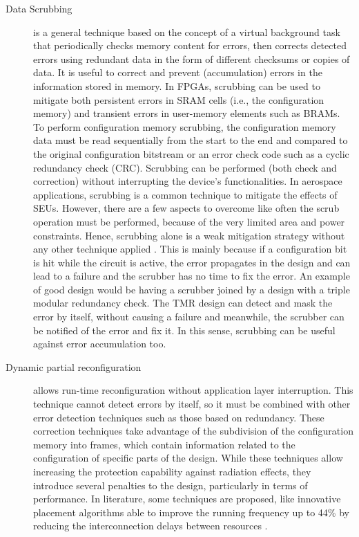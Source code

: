 \begin{description}
    \item[Data Scrubbing] is a general technique based on the concept of a virtual background task that periodically checks memory content for errors, then corrects detected errors using redundant data in the form of different checksums or copies of data. It is useful to correct and prevent (accumulation) errors in the information stored in memory. In FPGAs, scrubbing can be used to mitigate both persistent errors in SRAM cells (i.e., the configuration memory) and transient errors in user-memory elements such as BRAMs. To perform configuration memory scrubbing, the configuration memory data must be read sequentially from the start to the end and compared to the original configuration bitstream or an error check code such as a cyclic redundancy check (CRC). Scrubbing can be performed (both check and correction) without interrupting the device's functionalities. In aerospace applications, scrubbing is a common technique to mitigate the effects of SEUs. However, there are a few aspects to overcome like often the scrub operation must be performed, because of the very limited area and power constraints. Hence, scrubbing alone is a weak mitigation strategy without any other technique applied \cite{nasa_scrubbing}. This is mainly because if a configuration bit is hit while the circuit is active, the error propagates in the design and can lead to a failure and the scrubber has no time to fix the error. An example of good design would be having a scrubber joined by a design with a triple modular redundancy check. The TMR design can detect and mask the error by itself, without causing a failure and meanwhile, the scrubber can be notified of the error and fix it. In this sense, scrubbing can be useful against error accumulation too.
    \item[Dynamic partial reconfiguration] \cite{10.1007/978-3-030-44534-8_7} allows run-time reconfiguration without application layer interruption. This technique cannot detect errors by itself, so it must be combined with other error detection techniques such as those based on redundancy. These correction techniques take advantage of the subdivision of the configuration memory into frames, which contain information related to the configuration of specific parts of the design. While these techniques allow increasing the protection capability against radiation effects, they introduce several penalties to the design, particularly in terms of performance. In literature, some techniques are proposed, like innovative placement algorithms able to improve the running frequency up to 44\% by reducing the interconnection delays between resources \cite{10.1145/1366224.1366228}.
\end{description}

